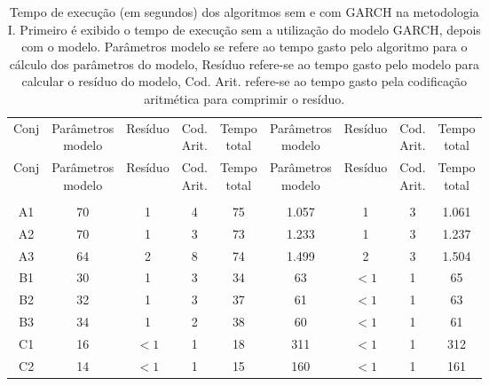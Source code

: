 \begin{center}
\begin{longtable}{ccccc|cccc}
\toprule
\rowcolor{white}
\caption[Metodologia I: tempo de execução]{Tempo de execução (em segundos)
dos algoritmos sem e com GARCH na metodologia I. Primeiro é exibido o tempo de
execução sem a utilização do modelo GARCH, depois com o modelo. Parâmetros
modelo se refere ao tempo gasto pelo algoritmo para o cálculo dos parâmetros do
modelo, Resíduo refere-se ao tempo gasto pelo modelo para calcular o resíduo do
modelo, Cod. Arit. refere-se ao tempo gasto pela codificação aritmética para
comprimir o resíduo.} \label{tab:EvolucaoEntropiaMet1}\\
\midrule
Conj & \specialcell{Parâmetros\\modelo} &
Resíduo & \specialcell{Cod.\\Arit.} & \specialcell{Tempo\\total} &
\specialcell{Parâmetros\\modelo} &
Resíduo & \specialcell{Cod.\\Arit.} & \specialcell{Tempo\\total} \\
\midrule
\endfirsthead 
\midrule
\rowcolor{white}
Conj & \specialcell{Parâmetros\\modelo} &
Resíduo & \specialcell{Cod.\\Arit.} & \specialcell{Tempo\\total} &
\specialcell{Parâmetros\\modelo} &
Resíduo & \specialcell{Cod.\\Arit.} & \specialcell{Tempo\\total} \\
\toprule
\endhead
\midrule \\ %
\endfoot
\bottomrule 
\endlastfoot
A1&70&1&4&75&1.057&1&3&1.061\\
A2&70&1&3&73&1.233&1&3&1.237\\
A3&64&2&8&74&1.499&2&3&1.504\\
B1&30&1&3&34&63&$<1$&1&65\\
B2&32&1&3&37&61&$<1$&1&63\\
B3&34&1&2&38&60&$<1$&1&61\\
C1&16&$<1$&1&18&311&$<1$&1&312\\
C2&14&$<1$&1&15&160&$<1$&1&161\\

\end{longtable}
\end{center}
